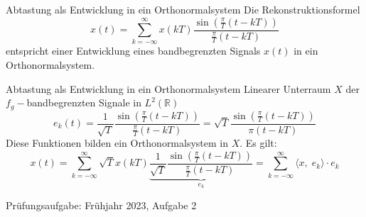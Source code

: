 \documentclass[14pt, aspectratio=169, handout]{beamer}
\begin{document}
\begin{frame}{Abtastung als Entwicklung in ein Orthonormalsystem}
    Die Rekonstruktionsformel
    $$x(t) = \sum_{k=-\infty}^\infty x(kT)\displaystyle\frac{\sin\left(\frac{\pi}{T}(t-kT)\right)}{\frac{\pi}{T}(t-kT)}$$
    entspricht einer Entwicklung eines bandbegrenzten Signals $x(t)$ in ein Orthonormalsystem.
\end{frame}

\begin{frame}{Abtastung als Entwicklung in ein Orthonormalsystem}
    Linearer Unterraum $X$ der $f_g-$bandbegrenzten Signale in $L^2(\mathbb{R})$
    $$e_k(t) = \frac{1}{\sqrt{T}}\frac{\sin\left(\frac{\pi}{T}(t-kT)\right)}{\frac{\pi}{T}(t-kT)} = \sqrt{T} \frac{\sin\left(\frac{\pi}{T}(t-kT)\right)}{\pi(t-kT)}$$
    Diese Funktionen bilden ein Orthonormalsystem in $X$. Es gilt:
    $$x(t) = \sum_{k=-\infty}^\infty \sqrt{T}x(kT)\underbrace{\frac{1}{\sqrt{T}}\frac{\sin\left(\frac{\pi}{T}(t-kT)\right)}{\frac{\pi}{T}(t-kT)}}_{e_k} = \sum_{k = -\infty}^\infty \langle x, \; e_k \rangle \cdot e_k$$
\end{frame}

\begin{frame}{Prüfungsaufgabe: Frühjahr 2023, Aufgabe 2}
    
\end{frame}
\end{document}
